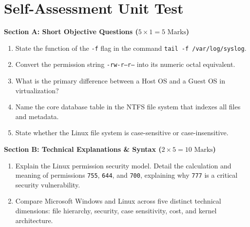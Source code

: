 \section{Self-Assessment Unit Test}

\begin{chaptertest}
\noindent\textbf{Section A: Short Objective Questions ($5 \times 1 = 5\text{ Marks}$)}
\begin{enumerate}[leftmargin=1.5em]
    \item State the function of the \texttt{-f} flag in the command \texttt{tail -f /var/log/syslog}.
    \item Convert the permission string \texttt{-rw-r--r--} into its numeric octal equivalent.
    \item What is the primary difference between a Host OS and a Guest OS in virtualization?
    \item Name the core database table in the NTFS file system that indexes all files and metadata.
    \item State whether the Linux file system is case-sensitive or case-insensitive.
\end{enumerate}

\medskip
\noindent\textbf{Section B: Technical Explanations \& Syntax ($2 \times 5 = 10\text{ Marks}$)}
\begin{enumerate}[leftmargin=1.5em, start=6]
    \item Explain the Linux permission security model. Detail the calculation and meaning of permissions \texttt{755}, \texttt{644}, and \texttt{700}, explaining why \texttt{777} is a critical security vulnerability.
    \item Compare Microsoft Windows and Linux across five distinct technical dimensions: file hierarchy, security, case sensitivity, cost, and kernel architecture.
\end{enumerate}


\end{chaptertest}

